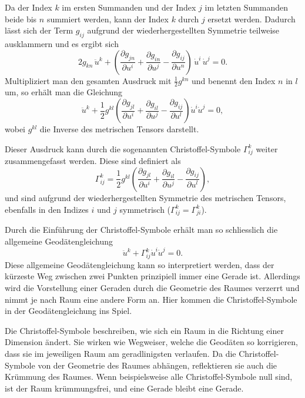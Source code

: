 Da der Index $k$ im ersten Summanden und der Index $j$ im letzten Summanden beide bis $n$ summiert werden, kann der Index $k$ durch $j$ ersetzt werden. 
Dadurch lässt sich der Term $g_{i\!j}$ aufgrund der wiederhergestellten Symmetrie teilweise ausklammern und es ergibt sich
\begin{equation}
	2 g_{kn} \, \ddot{u}^k + \left( \frac{\partial g_{jn}}{\partial u^i} + \frac{\partial g_{in}}{\partial u^j} - \frac{\partial g_{i\!j}}{\partial u^n} \right) \, \dot{u}^i \, \dot{u}^j = 0.
\end{equation}
Multipliziert man den gesamten Ausdruck mit $\frac{1}{2} g^{kn}$ und benennt den Index $n$ in $l$ um, so erhält man die Gleichung
\begin{equation}
	\ddot{u}^k + \frac{1}{2} g^{kl} \left( \frac{\partial g_{jl}}{\partial u^i} + \frac{\partial g_{il}}{\partial u^j} - \frac{\partial g_{i\!j}}{\partial u^l} \right) \dot{u}^i \dot{u}^j = 0,
\end{equation}
wobei $g^{kl}$ die Inverse des metrischen Tensors darstellt.

Dieser Ausdruck kann durch die sogenannten Christoffel-Symbole $\Gamma^k_{i\!j}$ weiter zusammengefasst werden.
%
Diese sind definiert als
\begin{equation}
	\Gamma^k_{i\!j} = \frac{1}{2} g^{kl} \left( \frac{\partial g_{jl}}{\partial u^i} + \frac{\partial g_{il}}{\partial u^j} - \frac{\partial g_{i\!j}}{\partial u^l} \right),
	\label{geodaeten:equation:StandardverfahrenGeodaeten:ChristopherSymbole}
\end{equation}
und sind aufgrund der wiederhergestellten Symmetrie des metrischen Tensors, ebenfalls in den Indizes $i$ und $j$ symmetrisch ($\Gamma^k_{i\!j} = \Gamma^k_{ji}$).

Durch die Einführung der Christoffel-Symbole erhält man so schliesslich die allgemeine Geodätengleichung
\begin{equation}
	\ddot{u}^k + \Gamma^k_{i\!j} \dot{u}^i \dot{u}^j = 0.
	\label{geodaeten:equation:StandardverfahrenGeodaeten:Geodaetengleichung}
\end{equation}
Diese allgemeine Geodätengleichung kann so interpretiert werden, dass der kürzeste Weg zwischen zwei Punkten prinzipiell immer eine Gerade ist. 
Allerdings wird die Vorstellung einer Geraden durch die Geometrie des Raumes verzerrt und nimmt je nach Raum eine andere Form an. 
Hier kommen die Christoffel-Symbole in der Geodätengleichung ins Spiel.

Die Christoffel-Symbole beschreiben, wie sich ein Raum in die Richtung einer Dimension ändert.
Sie wirken wie Wegweiser, welche die Geodäten so korrigieren, dass sie im jeweiligen Raum am geradlinigsten verlaufen. 
Da die Christoffel-Symbole von der Geometrie des Raumes abhängen, reflektieren sie auch die Krümmung des Raumes.
Wenn beispielsweise alle Christoffel-Symbole null sind, ist der Raum krümmungsfrei, und eine Gerade bleibt eine Gerade.

